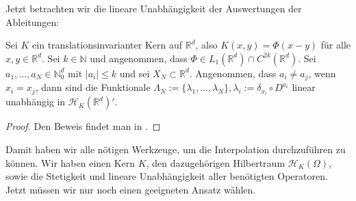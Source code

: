 Jetzt betrachten wir die lineare Unabhängigkeit der Auswertungen der Ableitungen:

\begin{theorem}
\label{linUn}
Sei $K$ ein translationsinvarianter Kern auf $\mathbb{R}^d$, also $K(x,y) = \Phi (x-y)$ für alle $x,y \in \mathbb{R}^d$. Sei $k \in \mathbb{N}$ und angenommen, dass $\Phi \in L_1(\mathbb{R}^d) \cap C^{2k}(\mathbb{R}^d)$. Sei $a_1, \dots, a_N \in \mathbb{N}_0^d$ mit $|a_i| \le k$ und sei $X_N \subset \mathbb{R}^d$. Angenommen, dass $a_i \neq a_j$, wenn $x_i = x_j$, dann sind die Funktionale $\Lambda_N := \{\lambda_1, \dots, \lambda_N\}, \lambda_i := \delta_{x_i} \circ D^{a_i}$ linear unabhängig in $\mathcal{H}_K(\mathbb{R}^d)'$.
\end{theorem}

\begin{proof}
Den Beweis findet man in \textcite[Theorem 16.4]{Wendland.2005}.
\end{proof}


Damit haben wir alle nötigen Werkzeuge, um die Interpolation durchzuführen zu können. Wir haben einen Kern $K$, den dazugehörigen Hilbertraum $\mathcal{H}_K(\Omega)$, sowie die Stetigkeit und lineare Unabhängigkeit aller benötigten Operatoren. Jetzt müssen wir nur noch einen geeigneten Ansatz wählen.
